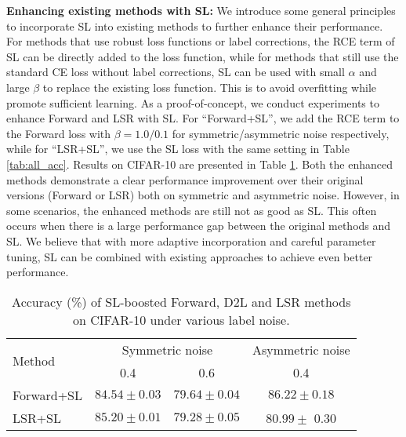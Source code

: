\documentclass[10pt,twocolumn,letterpaper]{article}
\begin{document}
\noindent\textbf{Enhancing existing methods with SL:}
We introduce some general principles to incorporate SL into existing methods to further enhance their performance. For methods that use robust loss functions or label corrections, the RCE term of SL can be directly added to the loss function, while for methods that still use the standard CE loss without label corrections, SL can be used with small $\alpha$ and large $\beta$ to replace the existing loss function. This is to avoid overfitting while promote sufficient learning. As a proof-of-concept, we conduct experiments to enhance Forward and LSR with SL. For ``Forward+SL'', we add the RCE term to the Forward loss with $\beta = 1.0/0.1$ for symmetric/asymmetric noise respectively, while for ``LSR+SL'', we use the SL loss with the same setting in Table \ref{tab:all_acc}. Results on CIFAR-10 are presented in Table \ref{tab:sce_d2l}. Both the enhanced methods demonstrate a clear performance improvement over their original versions (Forward or LSR) both on symmetric and asymmetric noise. However, in some scenarios, the enhanced methods are still not as good as SL. This often occurs when there is a large performance gap between the original methods and SL. We believe that with more adaptive incorporation and careful parameter tuning, SL can be combined with existing approaches to achieve even better performance.

\begin{table}[!t]
    \small
    \centering
    \caption{Accuracy (\%) of SL-boosted Forward, D2L and LSR methods on CIFAR-10 under various label noise.}
    \vspace{-0.1 in}
    \label{tab:sce_d2l}
    \begin{adjustbox}{width=0.49\textwidth}
    \begin{tabular}{l|cc|c}
    \hline
    \multirow{2}{*}{Method}  
    & \multicolumn{2}{c|}{Symmetric noise}  & \multicolumn{1}{c}{Asymmetric noise} \\
     & 0.4 & 0.6  & 0.4  \\
    \hline
    Forward+SL & $84.54 \pm 0.03$ & $79.64 \pm 0.04$ & $86.22 \pm 0.18$ \\
    LSR+SL & $85.20 \pm 0.01$ & $ 79.28 \pm 0.05 $ & $ 80.99 \pm $ 0.30\\
    \hline
    \end{tabular}
    \end{adjustbox}
    \vspace{-0.15 in}
\end{table}
\end{document}
